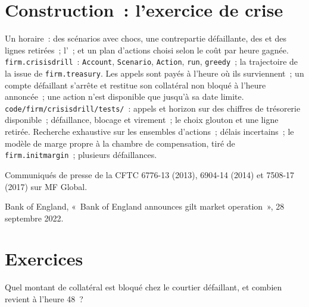 \section{Construction~: l'exercice de crise}\label{bld:fm:crisis-management:crisisdrill}

\begin{build}
 Un  horaire~: des scénarios avec chocs, une contrepartie défaillante, des  et des lignes retirées~; l'~;
et un plan d'actions choisi selon le coût par heure gagnée.
 \texttt{firm.crisisdrill}~: \texttt{Account}, \texttt{Scenario}, \texttt{Action}, \texttt{run}, \texttt{greedy}~; la trajectoire de la 
issue de \texttt{firm.treasury}.
 Les appels sont payés à l'heure où ils surviennent~; un compte défaillant s'arrête et restitue son collatéral non bloqué à l'heure annoncée~; une action
n'est disponible que jusqu'à sa date limite.
 \texttt{code/firm/crisisdrill/tests/}~: appels et horizon sur des chiffres de trésorerie disponible~; défaillance, blocage et virement~; le choix glouton
et une ligne retirée.
 Recherche exhaustive sur les ensembles d'actions~; délais incertains~; le modèle de marge propre à la chambre de compensation, tiré de \texttt{firm.initmargin}~; plusieurs
défaillances.
\end{build}

\begin{omsources}
\item Communiqués de presse de la CFTC 6776-13 (2013), 6904-14 (2014) et 7508-17 (2017) sur MF Global.
\item Bank of England, «~Bank of England announces gilt market operation~», 28 septembre 2022.
\end{omsources}

\section{Exercices}

\begin{exercise}[$\star$]\label{exo:fm:crisis-management:1}
Quel montant de collatéral est bloqué chez le courtier défaillant, et combien revient à l'heure 48~?
\end{exercise}

